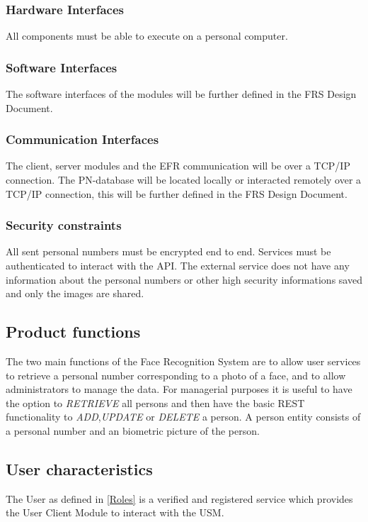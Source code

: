 \documentclass[a4paper,11pt]{article}
\begin{document}
\subsubsection{Hardware Interfaces}
All components must be able to execute on a personal computer.

\subsubsection{Software Interfaces}
The software interfaces of the modules will be further defined in the FRS Design Document.

\subsubsection{Communication Interfaces}
The client, server modules and the EFR communication will be over a TCP/IP connection.
The PN-database will be located locally or interacted remotely over a TCP/IP connection, this will be further defined in the FRS Design Document.

\subsubsection{Security constraints}
All sent personal numbers must be encrypted end to end. Services must be authenticated to interact with the API. The external service does not have any information about the personal numbers or other high security informations saved and only the images are shared.

\subsection{Product functions}
The two main functions of the Face Recognition System are to allow user services to retrieve a personal number corresponding to a photo of a face, and to allow administrators to manage the data.
\newline
\noindent
For managerial purposes it is useful to have the option to \textit{RETRIEVE} all persons and then have the basic REST functionality to \textit{ADD},\textit{UPDATE} or \textit{DELETE} a person. A person entity consists of a personal number and an biometric picture of the person.

\subsection{User characteristics}
The User as defined in \ref{Roles} is a verified and registered service which provides the User Client Module to interact with the USM.
\end{document}
